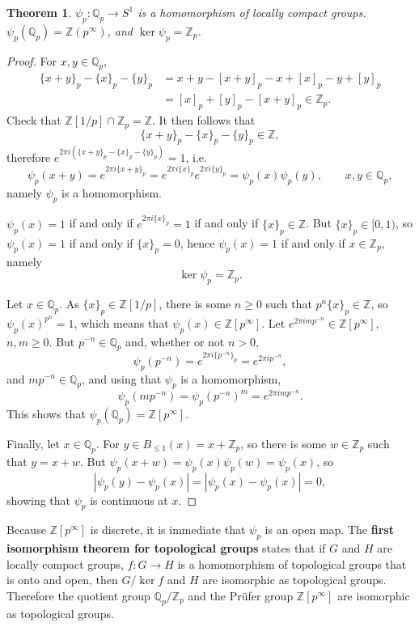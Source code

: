 \documentclass{article}
\newtheorem{theorem}{Theorem}
\theoremstyle{definition}
\begin{document}
\begin{theorem}
$\psi_p:\mathbb{Q}_p \to S^1$ is a  homomorphism of locally compact groups.
$\psi_p(\mathbb{Q}_p) = \mathbb{Z}(p^\infty)$, and $\ker \psi_p = \mathbb{Z}_p$.
\end{theorem}
\begin{proof}
For $x,y \in \mathbb{Q}_p$,
\begin{align*}
\{x+y\}_p - \{x\}_p - \{y\}_p &= x+y - [x+y]_p - x + [x]_p - y + [y]_p\\
&=[x]_p + [y]_p - [x+y]_p \in \mathbb{Z}_p.
\end{align*}
Check that $\mathbb{Z}[1/p] \cap \mathbb{Z}_p = \mathbb{Z}$. It then follows that
\[
\{x+y\}_p - \{x\}_p - \{y\}_p  \in \mathbb{Z},
\]
therefore $e^{2\pi i(\{x+y\}_p - \{x\}_p - \{y\}_p)}=1$, i.e.
\[
\psi_p(x+y) = e^{2\pi i\{x+y\}_p} = e^{2\pi i\{x\}_p} e^{2\pi i\{y\}_p}=\psi_p(x) \psi_p(y),\qquad x,y \in \mathbb{Q}_p,
\]
namely $\psi_p$ is a homomorphism.

$\psi_p(x)=1$ if and only if $e^{2\pi i\{x\}_p}=1$ if and only if $\{x\}_p \in \mathbb{Z}$. But
$\{x\}_p \in [0,1)$, so $\psi_p(x)=1$ if and only if $\{x\}_p=0$, hence
$\psi_p(x)=1$ if and only if $x \in \mathbb{Z}_p$, namely
\[
\ker \psi_p = \mathbb{Z}_p.
\]

Let $x \in \mathbb{Q}_p$. 
As $\{x\}_p \in \mathbb{Z}[1/p]$, there is some $n \geq 0$ such that $p^n \{x\}_p \in \mathbb{Z}$, so
$\psi_p(x)^{p^n} = 1$, which means that $\psi_p(x) \in \mathbb{Z}[p^\infty]$. 
Let $e^{2\pi imp^{-n}} \in \mathbb{Z}[p^\infty]$, $n,m \geq 0$. 
But $p^{-n} \in \mathbb{Q}_p$ and, whether or not $n >0$,
\[
\psi_p(p^{-n}) = e^{2\pi i\{p^{-n}\}_p} = e^{2\pi ip^{-n}},
\]
and $m p^{-n} \in \mathbb{Q}_p$, and using that $\psi_p$ is a homomorphism,
\[
\psi_p(mp^{-n}) = \psi_p(p^{-n})^m = e^{2\pi imp^{-n}}.
\]
This shows that $\psi_p(\mathbb{Q}_p) = \mathbb{Z}[p^\infty]$.

Finally, let $x \in \mathbb{Q}_p$. For $y \in B_{\leq 1}(x) = x+\mathbb{Z}_p$, 
so there is some $w \in \mathbb{Z}_p$ such that $y=x+w$. But $\psi_p(x+w)
=\psi_p(x) \psi_p(w)=\psi_p(x)$, so
\[
|\psi_p(y)-\psi_p(x)| = |\psi_p(x)-\psi_p(x)|=0,
\]
showing that $\psi_p$ is continuous at $x$. 
\end{proof}

Because $\mathbb{Z}[p^\infty]$ is discrete, it is immediate that $\psi_p$ is an open map.
The \textbf{first isomorphism theorem for topological groups} states that if
$G$ and $H$ are locally compact groups, $f:G \to H$ is a homomorphism of topological groups that is
onto and open, then $G/\ker f$ and $H$ are isomorphic as topological groups. 
Therefore the quotient group $\mathbb{Q}_p / \mathbb{Z}_p$ and the Pr\"ufer group $\mathbb{Z}[p^\infty]$
are isomorphic as topological groups.
\end{document}
